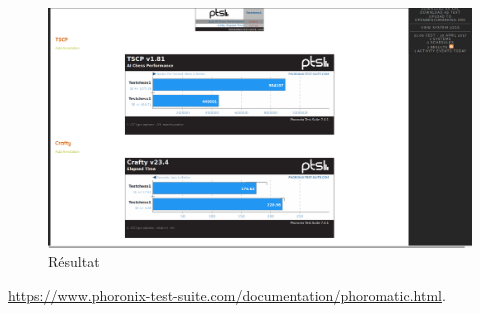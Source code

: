 \documentclass[french]{article}
\begin{document}
\begin{figure}[!h]
\caption{\label{Résultat} Résultat}
\includegraphics[scale=0.35]{images/res2.png}
\end{figure}

\newpage
\begin{thebibliography}{9}

       
          \url{https://www.phoronix-test-suite.com/documentation/phoromatic.html}.

\end{thebibliography}
\end{document}
